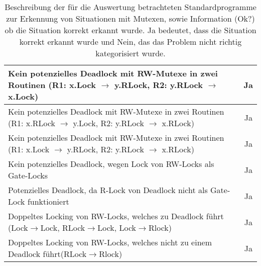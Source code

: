 \begin{table}[h]
\begin{tabular}{|l|c|}
  \makecell[l]{Kein potenzielles Deadlock mit RW-Mutexe in zwei Routinen\\(R1: x.Lock $\to$ y.RLock, R2: y.RLock $\to$ x.Lock)} & Ja \\ \hline
  \makecell[l]{Kein potenzielles Deadlock mit RW-Mutexe in zwei Routinen\\(R1: x.RLock $\to$ y.Lock, R2: y.RLock $\to$ x.RLock)} & Ja \\ \hline
  \makecell[l]{Kein potenzielles Deadlock mit RW-Mutexe in zwei Routinen\\(R1: x.Lock $\to$ y.RLock, R2: y.RLock $\to$ x.RLock)} & Ja \\ \hline
  Kein potenzielles Deadlock, wegen Lock von RW-Locks als Gate-Locks & Ja \\ \hline
  Potenzielles Deadlock, da R-Lock von Deadlock nicht als Gate-Lock funktioniert & Ja\\ \hline
  \makecell[l]{Doppeltes Locking von RW-Locks, welches zu Deadlock führt\\(Lock$\to$Lock, RLock$\to$Lock, Lock$\to$Rlock)} & Ja \\ \hline
  \makecell[l]{Doppeltes Locking von RW-Locks, welches nicht zu einem\\Deadlock führt(RLock$\to$Rlock)} & Ja \\ \hline
  \end{tabular}
  \caption{Beschreibung der für die Auswertung betrachteten 
    Standardprogramme zur Erkennung von Situationen mit Mutexen, sowie 
    Information (Ok?) ob die Situation korrekt erkannt wurde. Ja bedeutet, dass 
    die Situation korrekt erkannt wurde
    und Nein, das das Problem nicht richtig kategorisiert wurde.}
  \label{App-Stand-Mut}
  \end{table}

